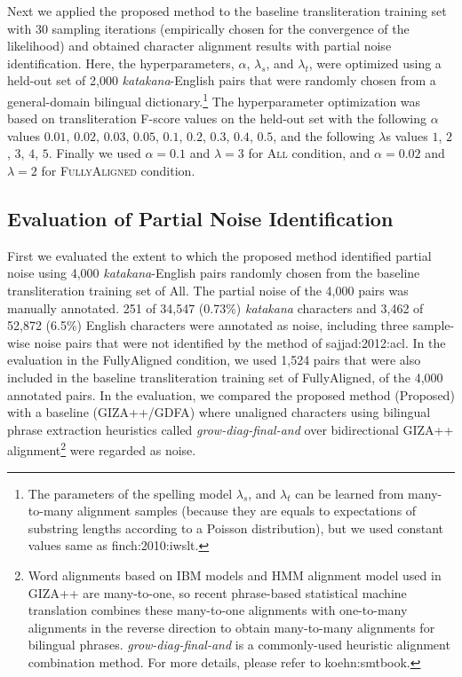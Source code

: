 \documentclass[english]{jnlp_1.4}
\makeatletter
\def\@{}
\newcommand{\newcite}{}
\makeatother
\begin{document}
Next we applied the proposed method to the baseline transliteration training set with 30 sampling iterations
(empirically chosen for the convergence of the likelihood)
and obtained character alignment results with partial noise identification.
Here, the hyperparameters, $\alpha$, $\lambda_{s}$, and $\lambda_{t}$, were optimized
using a held-out set of 2,000 {\it katakana}-English pairs
that were randomly chosen from a general-domain bilingual dictionary.\footnote{
The parameters of the spelling model $\lambda_{s}$, and $\lambda_{t}$ can be learned from many-to-many alignment samples
(because they are equals to expectations of substring lengths according to a Poisson distribution),
but we used constant values same as \newcite{finch:2010:iwslt}.}\@ 
The hyperparameter optimization was based on transliteration F-score values on the held-out set
with the following $\alpha$ values $0.01$, $0.02$, $0.03$, $0.05$, $0.1$, $0.2$, $0.3$, $0.4$, $0.5$,
and the following $\lambda$s values $1$, $2$, $3$, $4$, $5$.
Finally we used {$\alpha = 0.1$} and {$\lambda = 3$} for \textsc{All} condition,
and {$\alpha = 0.02$} and {$\lambda = 2$} for \textsc{FullyAligned} condition.


\subsection{Evaluation of Partial Noise Identification}

First we evaluated the extent to which the proposed method identified partial noise
using 4,000 {\it katakana}-English pairs randomly chosen from the baseline transliteration training set of {\sc All}.
The partial noise of the 4,000 pairs was manually annotated.
251 of 34,547 (0.73\%) {\it katakana} characters
and 3,462 of 52,872 (6.5\%) English characters were annotated as noise,
including three sample-wise noise pairs that were not identified by the method of \newcite{sajjad:2012:acl}.
In the evaluation in the {\sc FullyAligned} condition,
we used 1,524 pairs that were also included in the baseline transliteration training set of {\sc FullyAligned},
of the 4,000 annotated pairs.
In the evaluation, we compared the proposed method ({\sc Proposed})
with a baseline ({\sc GIZA++/GDFA})
where unaligned characters using bilingual phrase extraction heuristics
called {\em grow-diag-final-and}
over bidirectional GIZA++ alignment\footnote{Word alignments based on IBM models \cite{brown:1993:cl}
and HMM alignment model \cite{vogel:1996:coling} used in GIZA++ are many-to-one,
so recent phrase-based statistical machine translation combines
these many-to-one alignments with one-to-many alignments in the reverse direction
to obtain many-to-many alignments for bilingual phrases.
{\em grow-diag-final-and} is a commonly-used heuristic alignment combination method.
For more details, please refer to \newcite{koehn:smtbook}.}
were regarded as noise.
\end{document}
